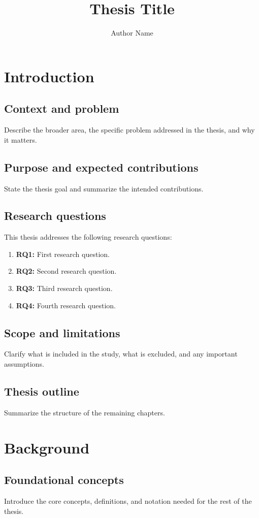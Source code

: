 \documentclass[PhD]{uclathes}
\title{Thesis Title}
\author{Author Name}
\begin{document}
\makeintropages

\chapter{Introduction}

\section{Context and problem}
Describe the broader area, the specific problem addressed in the thesis, and why it matters.

\section{Purpose and expected contributions}
State the thesis goal and summarize the intended contributions.

\section{Research questions}
This thesis addresses the following research questions:

\begin{enumerate}
    \item \textbf{RQ1:} First research question.
    \item \textbf{RQ2:} Second research question.
    \item \textbf{RQ3:} Third research question.
    \item \textbf{RQ4:} Fourth research question.
\end{enumerate}

\section{Scope and limitations}
Clarify what is included in the study, what is excluded, and any important assumptions.

\section{Thesis outline}
Summarize the structure of the remaining chapters.

\chapter{Background}

\section{Foundational concepts}
Introduce the core concepts, definitions, and notation needed for the rest of the thesis.
\end{document}
